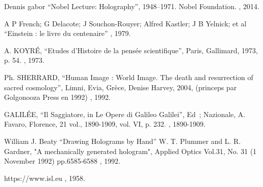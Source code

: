 \documentclass[a4paper,12pt]{article}
\begin{document}
\begin{appendix}
\begin{thebibliography}{1}
 Dennis gabor ``Nobel Lecture: Holography'', 1948–1971. Nobel Foundation.
, 2014.

 A P French; G Delacote; J Souchon-Rouyer; Alfred Kastler; J B Yelnick; et al ``Einstein : le livre du centenaire''
, 1979.

 A. KOYRÉ, ``Etudes d’Histoire de la pensée scientifique'', Paris, Gallimard, 1973, p. 54.
, 1973.

 Ph. SHERRARD, ``Human Image : World Image. The death and resurrection of sacred cosmology'', Limni, Evia, Grèce, Denise Harvey, 2004, (princeps par Golgonooza Press en 1992)
, 1992.

 GALILÉE, ``Il Saggiatore, in Le Opere di Galileo Galilei'', Ed ; Nazionale, A. Favaro, Florence, 21 vol., 1890-1909, vol. VI, p. 232.
, 1890-1909.

 William J. Beaty ``Drawing Holograms by Hand'' W. T. Plummer and L. R. Gardner, "A mechanically generated hologram", Applied Optics Vol.31, No. 31 (1 November 1992) pp.6585-6588
, 1992.

  https://www.isl.eu
, 1958.

\end{thebibliography}
\end{appendix}
\end{document}
